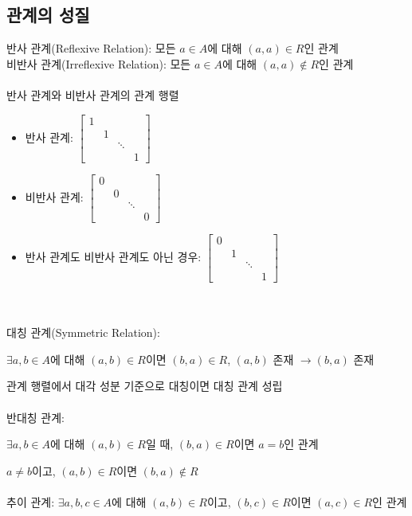 \subsection{관계의 성질}
반사 관계(Reflexive Relation): 모든 $a \in A$에 대해 $(a, a) \in R$인 관계\\
비반사 관계(Irreflexive Relation): 모든 $a \in A$에 대해 $(a, a) \not\in R$인 관계
\\\\
반사 관계와 비반사 관계의 관계 행렬
\begin{itemize}
    \item 반사 관계: $\begin{bmatrix}
        1 &   &   &  \\
          & 1 &   &  \\
          &   & \ddots &\\
          &   &   & 1
    \end{bmatrix}$
    \item 비반사 관계: $\begin{bmatrix}
        0 &   &   &  \\
          & 0 &   &  \\
          &   & \ddots &\\
          &   &   & 0
    \end{bmatrix}$
    \item 반사 관계도 비반사 관계도 아닌 경우: $\begin{bmatrix}
        0 &   &   &  \\
          & 1 &   &  \\
          &   & \ddots &\\
          &   &   & 1
    \end{bmatrix}$
\end{itemize}\hphantom{}\\\\
대칭 관계(Symmetric Relation):

$\exists a, b \in A$에 대해 $(a, b) \in R$이면 $(b, a) \in R$, $(a, b)$ 존재 $\to (b, a)$ 존재

관계 행렬에서 대각 성분 기준으로 대칭이면 대칭 관계 성립\\\\
반대칭 관계:

$\exists a, b \in A$에 대해 $(a, b) \in R$일 때, $(b, a) \in R$이면 $a = b$인 관계

$a \neq b$이고, $(a, b) \in R$이면 $(b, a) \not\in R$\\\\
추이 관계: $\exists a, b, c \in A$에 대해 $(a, b) \in R$이고, $(b, c) \in R$이면 $(a, c) \in R$인 관계

